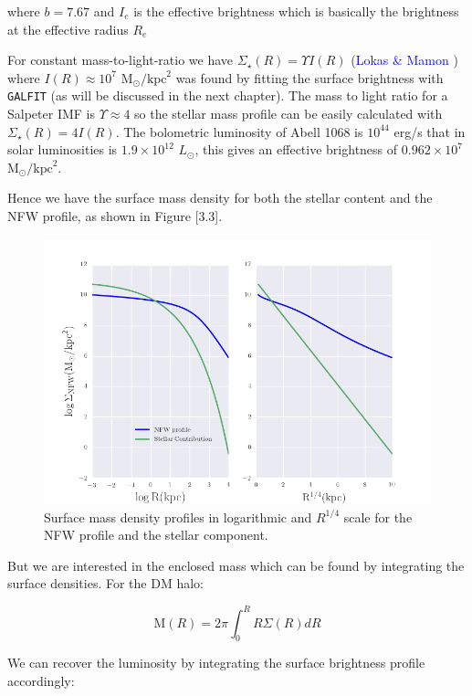 where $b=7.67$ and $I_{e}$ is the effective brightness which is basically the brightness at the effective radius $R_{e}$

For constant mass-to-light-ratio we have $\Sigma_{\star}(R)= \Upsilon I(R)$ (\textcolor{blue}{Lokas \& Mamon} \citeyear{Reference14}) where  $I(R)\approx 10^{7}$ $\text{M}_{\odot}/\text{kpc}^{2}$ was found by fitting the surface brightness with \texttt{GALFIT} (as will be discussed in the next chapter). The mass to light ratio for a Salpeter IMF is $\Upsilon\approx 4$ so the stellar mass profile can be easily calculated with  $\Sigma_{\star}(R)= 4I(R)$. The bolometric luminosity of Abell 1068 is $10^{44}$ erg/s that in solar luminosities is $1.9\times 10^{12}$ $L_{\odot}$, this gives an effective brightness of $0.962\times 10^{7}$ $\text{M}_{\odot}/\text{kpc}^2$. 

Hence we have the surface mass density for both the stellar content and the NFW profile, as shown in Figure [3.3].

\begin{figure}[H]
\centering
\includegraphics[width=12cm]{images/Surface_mass_density_log.png}
\caption[Surface mass density profiles]{Surface mass density profiles in logarithmic and $R^{1/4}$ scale for the NFW profile and the stellar component.}
\end{figure}

But we are interested in the enclosed mass which can be found by integrating the surface densities. For the DM halo:

\begin{equation}
\textrm {M}(R)=2\pi \int_{0}^{R} R\Sigma(R)dR
\end{equation}

We can recover the luminosity by integrating the surface brightness profile accordingly:

